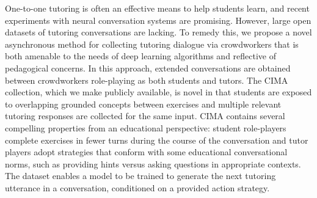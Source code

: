 One-to-one tutoring is often an effective means to help students learn, and recent experiments with neural conversation systems are promising.  However, large open datasets of tutoring conversations are lacking.  To remedy this, we propose a novel asynchronous method for collecting tutoring dialogue via crowdworkers that is both amenable to the needs of deep learning algorithms and reflective of pedagogical concerns.    In this approach, extended conversations are obtained between crowdworkers role-playing as both students and tutors.  The CIMA collection, which we make publicly available, is novel in that students are exposed to overlapping grounded concepts between exercises and multiple relevant tutoring responses are collected for the same input. CIMA contains several compelling properties from an educational perspective: student role-players complete exercises in fewer turns during the course of the conversation and tutor players adopt strategies that conform with some educational conversational norms, such as providing hints versus asking questions in appropriate contexts.  The dataset enables a model to be trained to generate the next tutoring utterance in a conversation, conditioned on a provided action strategy.
